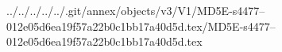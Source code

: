 ../../../../../.git/annex/objects/v3/V1/MD5E-s4477--012e05d6ea19f57a22b0c1bb17a40d5d.tex/MD5E-s4477--012e05d6ea19f57a22b0c1bb17a40d5d.tex